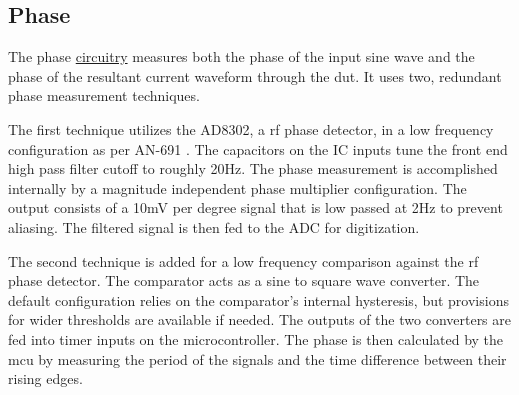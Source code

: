\subsection{Phase}

The phase \hyperlink{sch:imph}{circuitry} measures both the phase of the input sine wave and the phase of the resultant current waveform through the \gls{dut}. It uses two, redundant phase measurement techniques.

The first technique utilizes the AD8302, a \gls{rf} phase detector, in a low frequency configuration as per AN-691 \cite{AD8302_AppNote}. The capacitors on the IC inputs tune the front end high pass filter cutoff to roughly 20Hz. The phase measurement is accomplished internally by a magnitude independent phase multiplier configuration. The output consists of a 10mV per degree signal that is low passed at 2Hz to prevent aliasing. The filtered signal is then fed to the ADC for digitization.

The second technique is added for a low frequency comparison against the \gls{rf} phase detector. The comparator acts as a sine to square wave converter. The default configuration relies on the comparator's internal hysteresis, but provisions for wider thresholds are available if needed. The outputs of the two converters are fed into timer inputs on the microcontroller. The phase is then calculated by the \gls{mcu} by measuring the period of the signals and the time difference between their rising edges.

